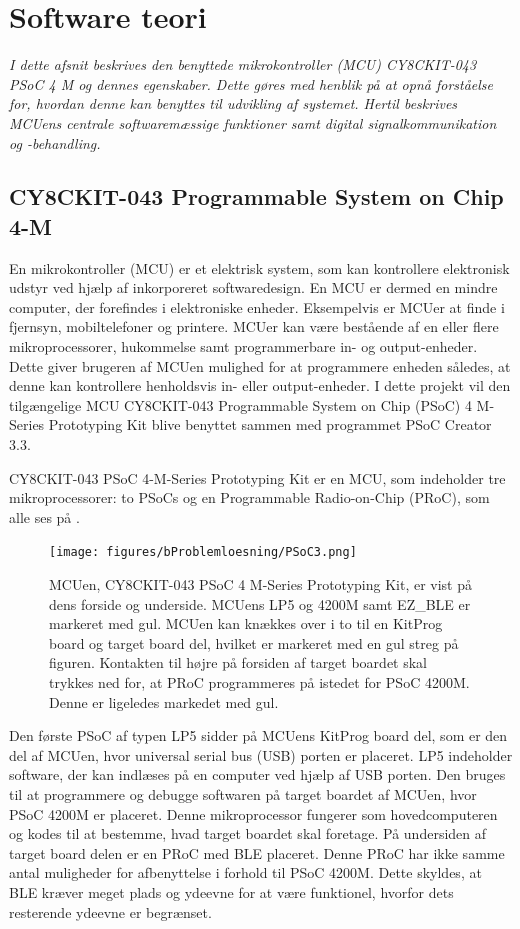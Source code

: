 \section{Software teori}
\textit{I dette afsnit beskrives den benyttede mikrokontroller (MCU) CY8CKIT-043 PSoC 4 M og dennes egenskaber. Dette gøres med henblik på at opnå forståelse for, hvordan denne kan benyttes til udvikling af systemet. Hertil beskrives MCUens centrale softwaremæssige funktioner samt digital signalkommunikation og -behandling.}

\subsection{CY8CKIT-043 Programmable System on Chip 4-M}
En mikrokontroller (MCU) er et elektrisk system, som kan kontrollere elektronisk udstyr ved hjælp af inkorporeret softwaredesign. En MCU er dermed en mindre computer, der forefindes i elektroniske enheder. Eksempelvis er MCUer at finde i fjernsyn, mobiltelefoner og printere. \citep{Scienceuddannelse,Tanenbaum2006} \newline
MCUer kan være bestående af en eller flere mikroprocessorer, hukommelse samt programmerbare in- og output-enheder. Dette giver brugeren af MCUen mulighed for at programmere enheden således, at denne kan kontrollere henholdsvis in- eller output-enheder. \citep{Scienceuddannelse,Tanenbaum2006} I dette projekt vil den tilgængelige MCU CY8CKIT-043 Programmable System on Chip (PSoC) 4 M-Series Prototyping Kit blive benyttet sammen med programmet PSoC Creator 3.3.

CY8CKIT-043 PSoC 4-M-Series Prototyping Kit er en MCU, som indeholder tre mikroprocessorer: to PSoCs og en Programmable Radio-on-Chip (PRoC), som alle ses på . \citep{CYPRESS2016PSoC}
\begin{figure}[H]
	\centering
	\texttt{[image: figures/bProblemloesning/PSoC3.png]}
	\caption{MCUen, CY8CKIT-043 PSoC 4 M-Series Prototyping Kit, er vist på dens forside og underside. MCUens LP5 og 4200M samt EZ\_BLE er markeret med gul. MCUen kan knækkes over i to til en KitProg board og target board del, hvilket er markeret med en gul streg på figuren. Kontakten til højre på forsiden af target boardet skal trykkes ned for, at PRoC programmeres på istedet for PSoC 4200M. Denne er ligeledes markedet med gul. \citep{CYPRESS2016PSoC,Semiconductor2016}}
	\label{fig:PSoC}
\end{figure}\vspace{-0.2cm}
Den første PSoC af typen LP5 sidder på MCUens KitProg board del, som er den del af MCUen, hvor universal serial bus (USB) porten er placeret. LP5 indeholder software, der kan indlæses på en computer ved hjælp af USB porten. Den bruges til at programmere og debugge softwaren på target boardet af MCUen, hvor PSoC 4200M er placeret. Denne mikroprocessor fungerer som hovedcomputeren og kodes til at bestemme, hvad target boardet skal foretage. På undersiden af target board delen er en PRoC med BLE placeret. Denne PRoC har ikke samme antal muligheder for afbenyttelse i forhold til PSoC 4200M. Dette skyldes, at BLE kræver meget plads og ydeevne for at være funktionel, hvorfor dets resterende ydeevne er begrænset.~\citep{CYPRESS2016PSoC,Semiconductor2016,CYPRESS2016Cortexm0}

